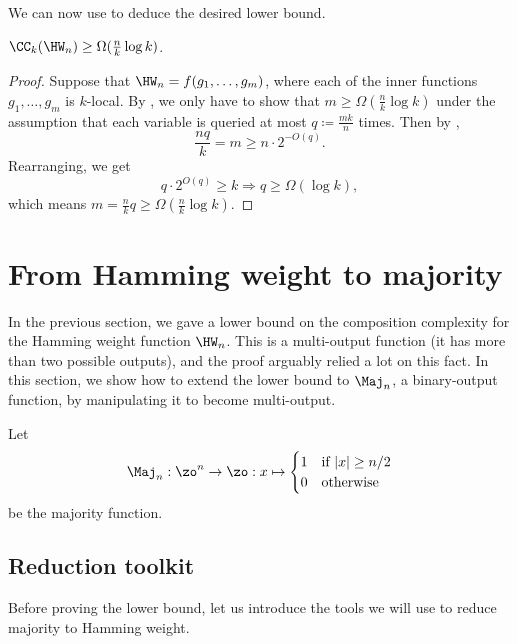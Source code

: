 We can now use  to deduce the desired lower bound.
\begin{theorem}
\label{thm:hamming-weight}
$\CC_k(\HW_n) \geq \Omega(\frac{n}{k}\log k)$.
\end{theorem}
\begin{proof}
Suppose that $\HW_n = f(g_1, \ldots, g_m)$, where each of the inner functions $g_1, \ldots, g_m$ is $k$-local.
By , we only have to show that $m \geq \Omega(\frac{n}{k} \log k)$ under the assumption that each variable is queried at most $q \coloneqq \frac{mk}{n}$ times.
Then by ,
\[
\frac{nq}{k}
= m
\geq n \cdot 2^{-O(q)}.
\]
Rearranging, we get
\[q \cdot 2^{O(q)} \geq k \Rightarrow q \geq \Omega(\log k),\]
which means $m = \frac{n}{k}q \geq \Omega(\frac{n}{k}\log k)$.
\end{proof}


\section{From Hamming weight to majority}
\label{sec:hw-to-maj}

In the previous section, we gave a lower bound on the composition complexity for the Hamming weight function $\HW_n$.
This is a multi-output function (it has more than two possible outputs), and the proof arguably relied a lot on this fact.
In this section, we show how to extend the lower bound to $\Maj_n$, a binary-output function, by manipulating it to become multi-output.

\begin{definition}
Let
\[
\Maj_n :\zo^n \to \zo: x \mapsto
\begin{cases}
1 & \text{if $|x| \geq n/2$}\\
0 & \text{otherwise}
\end{cases}
\]
be the majority function.
\end{definition}

\subsection{Reduction toolkit}
Before proving the lower bound, let us introduce the tools we will use to reduce majority to Hamming weight.

